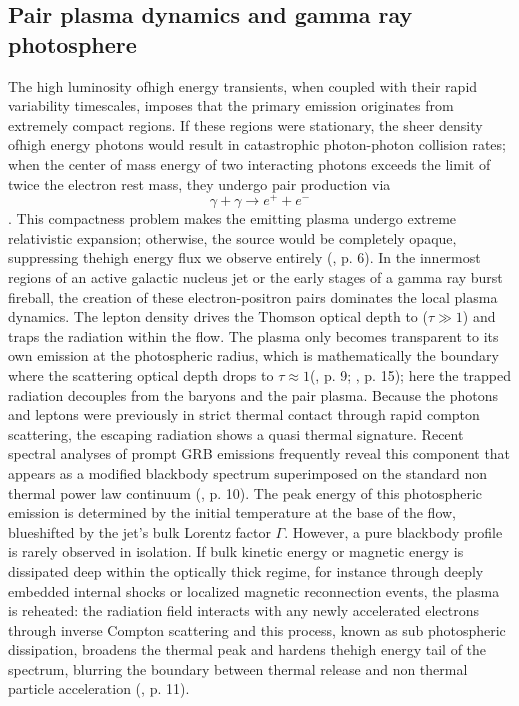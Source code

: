 \documentclass{aa} %
\begin{document}
\subsection{Pair plasma dynamics and gamma ray photosphere}
The high luminosity ofhigh energy transients, when coupled with their rapid variability timescales, imposes that the primary emission originates from extremely compact regions. If these regions were stationary, the sheer density ofhigh energy photons would result in catastrophic photon-photon collision rates; when the center of mass energy of two interacting photons exceeds the limit of twice the electron rest mass, they undergo pair production via 
\begin{equation}
    \gamma + \gamma \rightarrow e^+ + e^-
\end{equation}.
This compactness problem makes the emitting plasma undergo extreme relativistic expansion; otherwise, the source would be completely opaque, suppressing thehigh energy flux we observe entirely (\citet{KumarandZhang2015}, p. 6).
In the innermost regions of an active galactic nucleus jet or the early stages of a gamma ray burst fireball, the creation of these electron-positron pairs dominates the local plasma dynamics. The lepton density drives the Thomson optical depth to ($\tau \gg 1$) and traps the radiation within the flow. The plasma only becomes transparent to its own emission at the photospheric radius, which is mathematically the boundary where the scattering optical depth drops to $\tau \approx 1$(\citet{Peer2019}, p. 9; \citet{KumarandZhang2015}, p. 15); here the trapped radiation decouples from the baryons and the pair plasma. Because the photons and leptons were previously in strict thermal contact through rapid compton scattering, the escaping radiation shows a quasi thermal signature. Recent spectral analyses of prompt GRB emissions frequently reveal this component that appears as a modified blackbody spectrum superimposed on the standard non thermal power law continuum (\citet{Peer2019}, p. 10). The peak energy of this photospheric emission is determined by the initial temperature at the base of the flow, blueshifted by the jet's bulk Lorentz factor $\Gamma$.
However, a pure blackbody profile is rarely observed in isolation. If bulk kinetic energy or magnetic energy is dissipated deep within the optically thick regime, for instance through deeply embedded internal shocks or localized magnetic reconnection events, the plasma is reheated: the radiation field interacts with any newly accelerated electrons through inverse Compton scattering and this process, known as sub photospheric dissipation, broadens the thermal peak and hardens thehigh energy tail of the spectrum, blurring the boundary between thermal release and non thermal particle acceleration (\citet{Peer2019}, p. 11).
\end{document}
